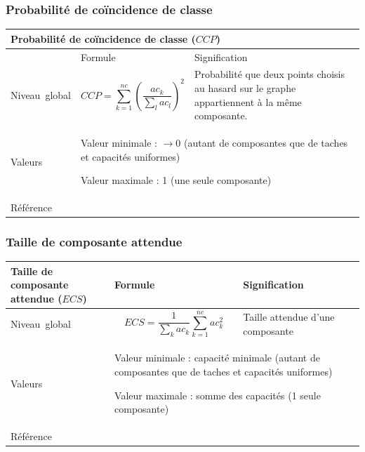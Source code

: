 \documentclass{article}
\begin{document}
\subsubsection{Probabilité de coïncidence de classe}
\label{metric_CCP}
\begin{table}[H]
\begin{tabular}{|m{3.24cm}|m{4.4810004cm}m{7.924cm}|}

\hline
\multicolumn{3}{|m{16.044998cm}|}{Probabilité de coïncidence de classe ($CCP$)}\\\hline
 &
\multicolumn{1}{m{4.4810004cm}|}{Formule} &
Signification\\\hline
Niveau~global &
\multicolumn{1}{m{4.4810004cm}|}{\begin{equation*}
\mathit{CCP}=\sum _{k=1}^{\mathit{nc}}{{\left(\frac{{\mathit{ac}}_{k}}{\sum _{l}{{\mathit{ac}}_{l}}}\right)}^{2}}
\end{equation*}
} &
Probabilité que deux points choisis au hasard sur le graphe appartiennent à la même composante.

\\\hline
Valeurs &
\multicolumn{2}{m{12.6050005cm}|}{Valeur minimale : $\rightarrow 0$ (autant de composantes que de taches et capacités uniformes)

Valeur maximale : 1 (une seule composante)

}\\\hline
Référence &
\multicolumn{2}{m{12.6050005cm}|}{\cite{Pascual2006}}\\\hline
\end{tabular}
\end{table}


\subsubsection{Taille de composante attendue}
\label{metric_ECS}
\begin{table}[H]
\begin{tabular}{|m{3.24cm}|m{4.4810004cm}m{7.924cm}|}

\hline
Taille de composante attendue ($ECS$) &
\multicolumn{1}{m{4.4810004cm}|}{Formule} &
Signification\\\hline
Niveau~global &
\multicolumn{1}{m{4.4810004cm}|}{\begin{equation*}
\mathit{ECS}=\frac{1}{\sum _{k}{{\mathit{ac}}_{k}}}\sum _{k=1}^{\mathit{nc}}{{{\mathit{ac}}_{k}^{2}}}
\end{equation*}
} &
Taille attendue d'une composante

\\\hline
Valeurs &
\multicolumn{2}{m{12.6050005cm}|}{Valeur minimale : capacité minimale (autant de composantes que de taches et capacités uniformes)

Valeur maximale : somme des capacités (1 seule composante)

}\\\hline
Référence &
\multicolumn{2}{m{12.6050005cm}|}{\cite{OBrien2006}}\\\hline
\end{tabular}
\end{table}
\end{document}
